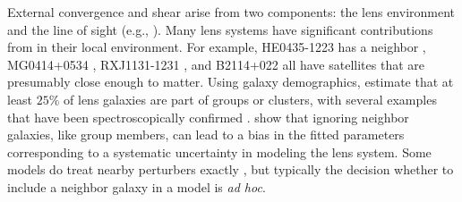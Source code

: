 
External convergence and shear arise from two components: the lens environment and the line of sight (e.g., \citealt{Jaroszynski14,Seljak94,Bar-Kana96,Keeton97}). Many lens systems have significant contributions from in their local environment. For example, HE0435-1223 has a neighbor \citep{Kochanek06}, MG0414+0534 \citep{Tonry99}, RXJ1131-1231 \citep{Sluse03}, and B2114+022 \citep{King99} all have satellites that are presumably close enough to matter. Using galaxy demographics, \citet{Keeton00} estimate that at least $25\%$ of lens galaxies are part of groups or clusters, with several examples that have been spectroscopically confirmed \citep[][and references therein]{Momcheva06}. \citet{Keeton04} show that ignoring neighbor galaxies, like group members, can lead to a bias in the fitted  parameters corresponding to a systematic uncertainty in modeling the lens system. Some models do treat nearby perturbers exactly \citep[e.g.][]{Fadely12}, but typically the decision whether to include a neighbor galaxy in a model is \textit{ad hoc}.

